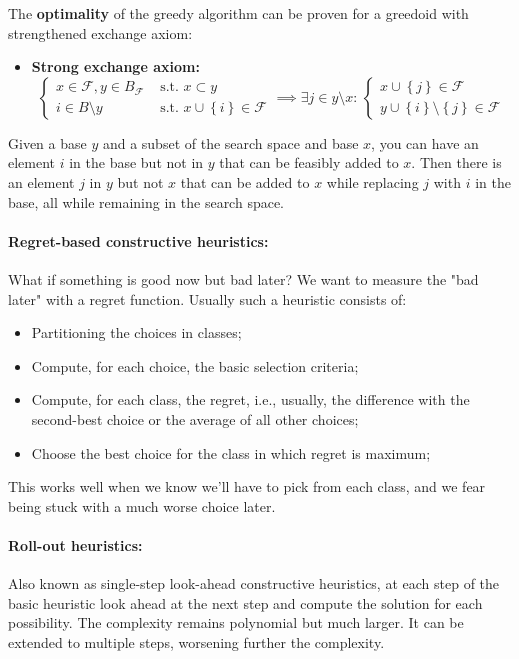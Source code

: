\documentclass{article}
\begin{document}
	The \textbf{optimality} of the greedy algorithm can be proven for a greedoid with strengthened exchange axiom: 
	\begin{itemize}
		\item \textbf{Strong exchange axiom:}
		$$ 
		\begin{cases}
			x \in \mathcal{F}, y \in B_{\mathcal{F}} & \text{ s.t. } x \subset y \\
			i \in B \setminus y & \text{ s.t. } x \cup \left\{i\right\} \in \mathcal{F}
		\end{cases}
		\implies \exists j \in y \setminus x: \, 
		\begin{cases}
			x \cup \left\{j\right\} \in \mathcal{F} \\
			y \cup \left\{i\right\} \setminus \left\{j\right\} \in \mathcal{F}
		\end{cases}
		$$
	\end{itemize}
	Given a base $y$ and a subset of the search space and base $x$, you can have an element $i$ in the base but not in $y$ that can be feasibly added to $x$. Then there is an element $j$ in $y$ but not $x$ that can be added to $x$ while replacing $j$ with $i$ in the base, all while remaining in the search space.\\
	
	\paragraph{Regret-based constructive heuristics:} What if something is good now but bad later? We want to measure the "bad later" with a regret function. Usually such a heuristic consists of:
	\begin{itemize}
		\item Partitioning the choices in classes;
		\item Compute, for each choice, the basic selection criteria;
		\item Compute, for each class, the regret, i.e., usually, the difference with the second-best choice or the average of all other choices;
		\item Choose the best choice for the class in which regret is maximum;
	\end{itemize}
	This works well when we know we'll have to pick from each class, and we fear being stuck with a much worse choice later.\\
	
	\paragraph{Roll-out heuristics:} Also known as single-step look-ahead constructive heuristics, at each step of the basic heuristic look ahead at the next step and compute the solution for each possibility. The complexity remains polynomial but much larger. It can be extended to multiple steps, worsening further the complexity.\\
	
\end{document}

